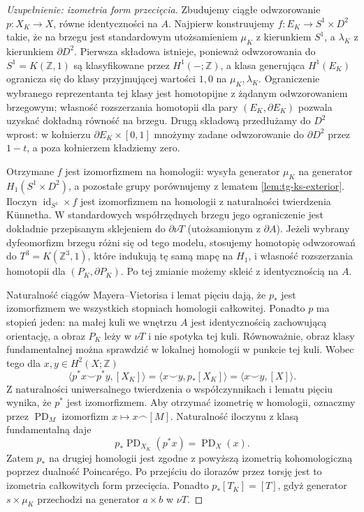 \begin{proof}[Uzupełnienie: izometria form przecięcia]
Zbudujemy ciągłe odwzorowanie $p:X_K\to X$,
równe identyczności na $A$. Najpierw konstruujemy
$f:E_K\to S^1\times D^2$ takie, że na brzegu
jest standardowym utożsamieniem $\mu_K$ z kierunkiem
$S^1$, a $\lambda_K$ z kierunkiem $\partial D^2$.
Pierwsza składowa istnieje, ponieważ odwzorowania
do $S^1=K(\mathbb Z,1)$ są klasyfikowane przez
$H^1(-;\mathbb Z)$, a klasa generująca $H^1(E_K)$
ogranicza się do klasy przyjmującej wartości $1,0$
na $\mu_K,\lambda_K$. Ograniczenie wybranego
reprezentanta tej klasy jest homotopijne z żądanym
odwzorowaniem brzegowym; własność rozszerzania
homotopii dla pary $(E_K,\partial E_K)$ pozwala
uzyskać dokładną równość na brzegu.
Drugą składową przedłużamy do $D^2$ wprost:
w kołnierzu $\partial E_K\times[0,1]$ mnożymy
zadane odwzorowanie do $\partial D^2$ przez $1-t$,
a poza kołnierzem kładziemy zero.

Otrzymane $f$ jest izomorfizmem na homologii:
wysyła generator $\mu_K$ na generator $H_1(S^1\times D^2)$,
a pozostałe grupy porównujemy z lematem
\ref{lem:tg-ks-exterior}. Iloczyn $\operatorname{id}_{S^1}\times f$
jest izomorfizmem na homologii z naturalności
twierdzenia Künnetha. W standardowych współrzędnych
brzegu jego ograniczenie jest dokładnie przepisanym
sklejeniem do $\partial\nu T$ (utożsamionym z
$\partial A$). Jeżeli wybrany dyfeomorfizm brzegu
różni się od tego modelu, stosujemy homotopię
odwzorowań do $T^3=K(\mathbb Z^3,1)$,
które indukują tę samą mapę na $H_1$,
i własność rozszerzania homotopii dla
$(P_K,\partial P_K)$. Po tej zmianie możemy
skleić z identycznością na $A$.

Naturalność ciągów Mayera--Vietorisa i lemat pięciu
dają, że $p_*$ jest izomorfizmem we wszystkich
stopniach homologii całkowitej. Ponadto $p$ ma
stopień jeden: na małej kuli we wnętrzu $A$
jest identycznością zachowującą orientację, a
obraz $P_K$ leży w $\nu T$ i nie spotyka tej kuli.
Równoważnie, obraz klasy fundamentalnej można
sprawdzić w lokalnej homologii w punkcie tej kuli.
Wobec tego dla $x,y\in H^2(X;\mathbb Z)$
\[
\langle p^*x\smile p^*y,[X_K]\rangle
=\langle x\smile y,p_*[X_K]\rangle
=\langle x\smile y,[X]\rangle.
\]
Z naturalności uniwersalnego twierdzenia
o współczynnikach i lematu pięciu wynika,
że $p^*$ jest izomorfizmem. Aby otrzymać izometrię
w homologii, oznaczmy przez $\operatorname{PD}_M$
izomorfizm $x\mapsto x\frown[M]$. Naturalność
iloczynu z klasą fundamentalną daje
\[
p_*\operatorname{PD}_{X_K}(p^*x)
=\operatorname{PD}_X(x).
\]
Zatem $p_*$ na drugiej homologii jest zgodne
z powyższą izometrią kohomologiczną poprzez
dualność Poincarégo. Po przejściu do ilorazów przez
torsję jest to izometria całkowitych form przecięcia. Ponadto $p_*[T_K]=[T]$, gdyż
generator $s\times\mu_K$ przechodzi na generator
$a\times b$ w $\nu T$.
\end{proof}

